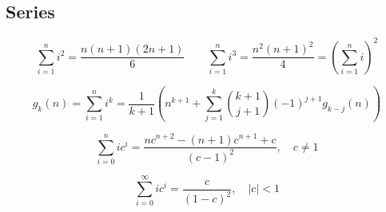 \subsection{Series}

$$\sum_{i=1}^{n} i^{2} = \frac{n(n+1)(2n+1)}{6}  \qquad  \sum_{i=1}^{n} i^{3} = \frac{n^{2}(n+1)^{2}}{4} = \left(\sum_{i=1}^n i\right)^2$$

$$ g_k(n) = \sum_{i=1}^n i^k = \frac{1}{k+1} \left( n^{k+1} + \sum_{j=1}^k \binom{k+1}{j+1} (-1)^{j+1} g_{k-j}(n) \right) $$

$$\sum_{i=0}^{n} ic^{i} = \frac{nc^{n+2} - (n+1)c^{n+1} + c}{(c-1)^{2}}, \quad c \neq 1$$

$$\sum_{i=0}^{\infty} ic^{i} = \frac{c}{(1-c)^{2}}, \quad |c| < 1$$
